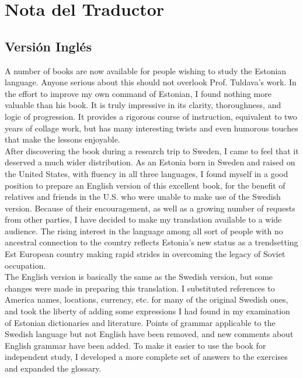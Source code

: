 \section*{Nota del Traductor}

\subsection*{Versión Inglés}

A number of books are now available for people wishing to study the Estonian language. Anyone serious about this should not overlook Prof. Tuldava's work. In the effort to improve my own command of Estonian, I found nothing more valuable than his book. It is truly impressive in its clarity, thoroughness, and logic of progression. It provides a rigorous course of instruction, equivalent to two years of collage work, but has many interesting twists and even humorous touches that make the lessons enjoyable.\\

After discovering the book during a research trip to Sweden, I came to feel that it deserved a much wider distribution. As an Estonia born in Sweden and raised on the United States, with fluency in all three languages, I found myself in a good position to prepare an English version of this excellent book, for the benefit of relatives and friends in the U.S. who were unable to make use of the Swedish version. Because of their encouragement, as well as a growing number of requests from other parties, I have decided to make my translation available to a wide audience. The rising interest in the language among all sort of people with no ancestral connection to the country reflects Estonia's new status as a trendsetting Est European country making rapid strides in overcoming the legacy of Soviet occupation.\\

The English version is basically the same as the Swedish version, but some changes were made in preparing this translation. I substituted references to America names, locations, currency, etc. for many of the original Swedish ones, and took the liberty of adding some expressions I had found in my examination of Estonian dictionaries and literature. Points of grammar applicable to the Swedish language but not English have been removed, and new comments about English grammar have been added. To make it easier to use the book for independent study, I developed a more complete set of answers to the exercises and expanded the glossary.\\

